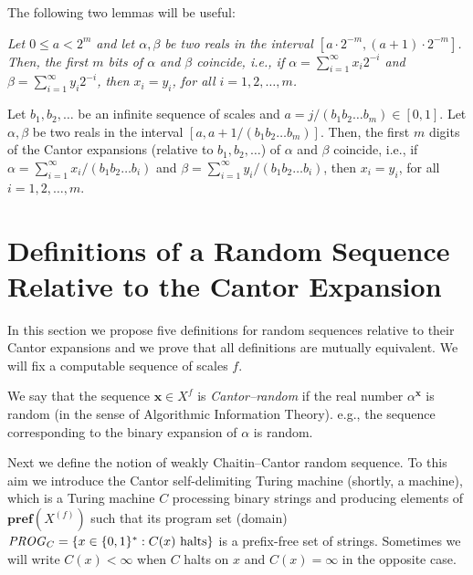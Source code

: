 \documentclass{elsart}
\begin{document}
The following two lemmas will be useful:

{\it Let $0 \le a < 2^{m}$ and let $\alpha, \beta$ be two reals in the interval
$[a\cdot 2^{-m}, (a+1)\cdot 2^{-m}]$. Then, the first $m$ bits of $\alpha$
and $\beta$ coincide, i.e., if $\alpha = \sum_{i=1}^{\infty} x_{i}2^{-i}$
and $\beta = \sum_{i=1}^{\infty} y_{i}2^{-i}$, then $x_{i}=y_{i}$, for all
$i =1,2, \ldots ,m$.


Let $b_{1}, b_{2}, \ldots$ be an infinite sequence of scales
and $a= j/(b_{1}b_{2}\ldots b_{m})\in [0,1]. $  Let $\alpha, \beta$ be two reals in the interval
$[a, a + 1/(b_{1}b_{2}\ldots b_{m})]$. Then, the first $m$ digits of the
Cantor expansions (relative to $b_{1}, b_{2}, \ldots$) of $\alpha$ and
$\beta$ coincide, i.e., if $\alpha = \sum_{i=1}^{\infty}
x_{i}/(b_{1}b_{2}\ldots b_{i})$
and $\beta = \sum_{i=1}^{\infty} y_{i}/(b_{1}b_{2}\ldots b_{i})$, then
$x_{i}=y_{i}$, for all $i =1,2, \ldots ,m$.}

\section{Definitions of a Random Sequence Relative to the Cantor Expansion}


In this section we propose five definitions for random sequences relative to
their
Cantor expansions and we prove that all definitions are mutually equivalent.
We will fix a computable sequence of scales $f$.

We say that the sequence ${\mathbf x} \in X^{f}$ is {\it Cantor--random} if the real
number
$\alpha^{{\mathbf x}}$ is random (in the sense of Algorithmic Information Theory).
e.g., the sequence corresponding to the binary expansion of $\alpha$ is
random.


Next we define the notion of weakly Chaitin--Cantor random sequence. To this
aim we introduce the Cantor self-delimiting Turing machine (shortly, a
machine), which is a
 Turing machine $C$ processing binary strings and producing
elements of ${{\mathbf{pref}({{X^{(f)}}})}}$ such that its
program set (domain)
${\it PROG}_C=\{x\in\{0,1\}^* : C(x) \mbox{  halts}\}$
is   a prefix-free set of strings. Sometimes
we will write $C(x) < \infty$ when $C$ halts on $x$ and $C(x) = \infty$ in
the
opposite case.
\end{document}
